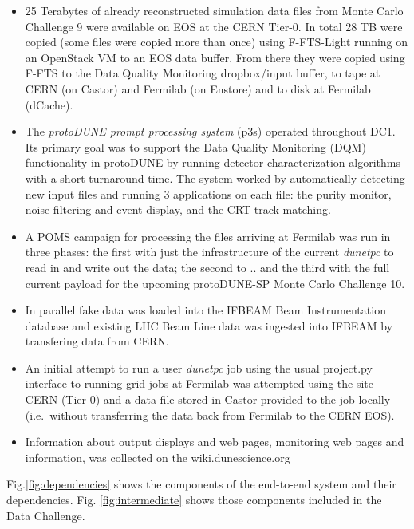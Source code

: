\documentclass[pdftex,12pt,letter]{article}
\newcommand{\pd}{protoDUNE\xspace}
\newcommand{\dtpc}{\textit{dunetpc}\xspace}
\begin{document}
\begin{itemize}

\item 25 Terabytes of already reconstructed simulation data files from Monte Carlo Challenge 9 were available on EOS at the CERN Tier-0.
In total 28 TB  were copied (some files were copied more than once) using F-FTS-Light running on an OpenStack VM to an EOS data buffer.
From there they were copied using F-FTS to the Data Quality Monitoring dropbox/input buffer, to tape at CERN (on Castor) and Fermilab
(on Enstore) and to disk at Fermilab (dCache). 

\item   The \textit{protoDUNE prompt processing system} (p3s) operated throughout DC1. Its primary goal was to support
the Data Quality Monitoring (DQM)  functionality in \pd by running detector characterization algorithms with a short turnaround time.
The system worked by automatically detecting new input files and running 3 applications on each file: the purity monitor,
noise filtering and event display, and the CRT track matching. 

\item A POMS campaign for processing the files arriving at Fermilab was run in three phases: the first with just the infrastructure
of the current \dtpc to read in and write out the data; the second to .. and the third with the full current payload for the
upcoming protoDUNE-SP Monte Carlo Challenge 10. 

\item In parallel fake data was loaded into the IFBEAM Beam Instrumentation database and existing LHC Beam Line data was ingested into IFBEAM by transfering data from CERN.

\item An initial attempt to run a user \dtpc job using the  usual project.py interface to running grid jobs at Fermilab was
attempted using the site CERN (Tier-0) and a data file stored in Castor provided to the job locally (i.e.~without transferring
the data back from Fermilab to the CERN EOS). 

\item Information about output displays and web pages, monitoring web pages and information, was collected on the wiki.dunescience.org

\end{itemize}

 Fig.\ref{fig:dependencies} shows the components of the end-to-end system and their dependencies. Fig. \ref{fig:intermediate} shows those components included in the Data Challenge. 
\end{document}
